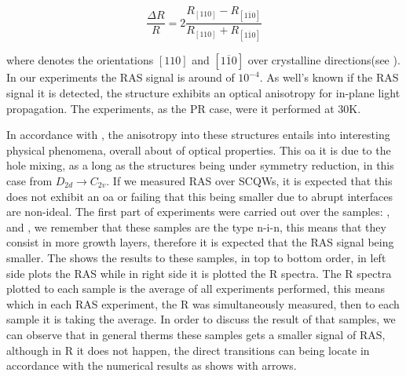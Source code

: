 \begin{equation}\label{eqn:chapter-3-sec-ras-rasequation}
\dfrac{\Delta R}{R} = 2\dfrac{R_{\left[110\right]}-R_{\left[1\overline{1}0\right]}}{R_{\left[110\right]}+
R_{\left[1\overline{1}0\right]}}
\end{equation}

where denotes the orientations $\left[110\right]$ and $\left[1\overline{1}0\right]$ over crystalline directions(see ). In our experiments the \gls{RAS} signal is around of $10^{-4}$. As well's known if the \gls{RAS} signal it is detected, the structure exhibits an optical anisotropy for in-plane light propagation\cite{koopmans1998microscopic}. The experiments, as the PR case, were it performed at 30K. 

In accordance with , the anisotropy into these structures entails into interesting physical phenomena, overall about of optical properties. This \gls{oa} it is due to the hole mixing, as a long as the structures being under symmetry reduction, in this case from $D_{2d}\to C_{2v}$. If we measured RAS over \gls{SCQWs}, it is expected that this does not exhibit an \gls{oa} or failing that this being smaller due to abrupt interfaces are non-ideal. 
The first part of experiments were carried out over the samples: ,  and ,  we remember that these samples are the type n-i-n, this means that they consist in more growth layers, therefore it is expected that the \gls{RAS} signal being smaller. The  shows the results to these samples, in top to bottom order, in left side plots the \gls{RAS} while in right side it is plotted the \gls{R} spectra. The \gls{R} spectra plotted to each sample is the average of all experiments performed, this means which in each \gls{RAS} experiment, the \gls{R} was simultaneously measured, then to each sample it is taking the average.  In order to discuss the result of that samples, we can observe that in general therms these samples gets a smaller signal of \gls{RAS}, although in \gls{R} it does not happen, the direct transitions can being locate in accordance with the numerical results as shows with arrows.
